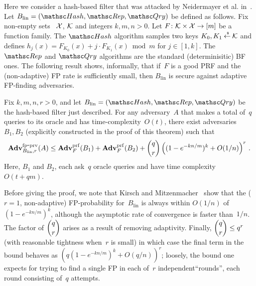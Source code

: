 Here we consider a hash-based filter that was attacked by Neidermayer et al. in~\cite{xxx}.  Let $B_{\mathrm{lin}}=(\Hash,\Rep,\Qry)$ be defined as follows.  Fix non-empty sets ~${\cal X}$, ${\cal K}$ and integers $k,m,n>0$.  Let $F\colon\mathcal{K} \times {\cal X} \to [m]$ be a function family.  The $\Hash$ algorithm samples two keys $K_0,K_1 {\:\stackrel{{\scriptscriptstyle \hspace{0.2em}\$}} {\leftarrow}\:} \mathcal{K}$ and defines $h_j(x) = F_{K_0}(x) + j\cdot F_{K_1}(x) \bmod m$ for $j \in [1,k]$.  The $\Rep$ and $\Qry$ algorithms are the standard (determinisitic) BF ones. The following result shows, informally, that if~$F$ is a good PRF and the (non-adaptive) FP rate is sufficiently small, then $B_\mathrm{lin}$ is secure against adaptive FP-finding adversaries.

\begin{theorem}\label{thm1}
Fix $k,m,n,r>0$, and let $B_\mathrm{lin}=(\Hash,\Rep,\Qry)$ be the hash-based filter just described. 
For any adversary~$A$ that makes a total of~$q$ queries to its oracle
and has time-complexity~$O(t)$,
there exist adversaries~$B_1,B_2$ (explicitly constructed in the proof of this theorem) such that
\[
\mathrm{\mathbf{Adv}}^{\mathrm{fp\mbox{-}prv}}_{B_{\mathrm{lin}},r}(A) \leq  \mathbf{Adv}^{\mathrm{prf}}_{F}(B_1) + \mathbf{Adv}^{\mathrm{prf}}_{F}(B_2)  +{\dbinom{q}{r}} \left( (1-e^{-kn/m})^k + O(1/n) \right)^r\,.
\]
Here, $B_1$ and $B_2$, each ask~$q$ oracle queries and have time complexity~$O(t+qm)$.
\end{theorem}
Before giving the proof, we note that Kirsch and Mitzenmacher~\cite{xxx} show
that the ($r=1$, non-adaptive) FP-probability for~$B_\mathrm{lin}$ is
always within $O(1/n)$ of $(1-e^{-kn/m})^k$, although the asymptotic
rate of convergence is faster than~$1/n$.  The factor of $\dbinom{q}{r}$ arises as a result
of removing adaptivity.  Finally, $\dbinom{q}{r} \leq q^r$ (with
reasonable tightness when~$r$ is small) in which case the final term in the bound behaves as 
$(q (1-e^{-kn/m})^k + O(q/n) )^r$; loosely, the bound one expects for
trying to find a single FP in each of~$r$ independent``rounds'', each round
consisting of~$q$ attempts.

